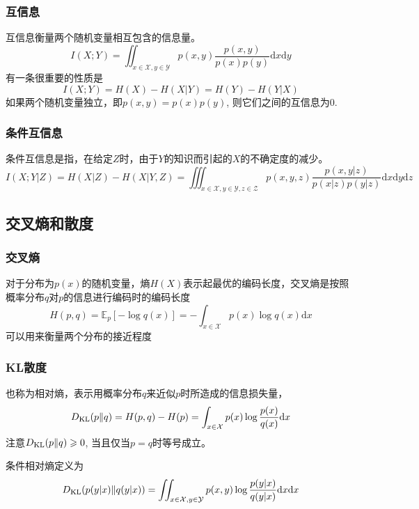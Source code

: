 \subsubsection{互信息}
互信息衡量两个随机变量相互包含的信息量。
\begin{equation}
    I(X;Y)=\iint_{x\in\mathcal{X},y\in\mathcal{Y}}p(x,y)\frac{p(x,y)}{p(x)p(y)}\mathrm{d}x\mathrm{d}y
\end{equation}
有一条很重要的性质是
\begin{equation}
    I(X;Y)=H(X)-H(X|Y)=H(Y)-H(Y|X)
\end{equation}
如果两个随机变量独立，即$p(x,y)=p(x)p(y)$, 则它们之间的互信息为0.

\subsubsection{条件互信息}
条件互信息是指，在给定$Z$时，由于$Y$的知识而引起的$X$的不确定度的减少。
\begin{equation}
    I(X;Y|Z)=H(X|Z)-H(X|Y,Z)=\iiint_{x\in\mathcal{X},y\in\mathcal{Y},z\in\mathcal{Z}}p(x,y,z)\frac{p(x,y|z)}{p(x|z)p(y|z)}\mathrm{d}x\mathrm{d}y\mathrm{d}z
\end{equation}


\subsection{交叉熵和散度}
\subsubsection{交叉熵}
对于分布为$p(x)$的随机变量，熵$H(X)$表示起最优的编码长度，交叉熵是按照概率分布$q$对$p$的信息进行编码时的编码长度
\begin{equation}
    H(p,q)=\mathbb{E}_{p}[-\log q(x)]= -\int_{x\in\mathcal{X}}p(x)\log q(x)\mathrm{d}x
\end{equation}
可以用来衡量两个分布的接近程度

\subsubsection{KL散度}
也称为相对熵，表示用概率分布$q$来近似$p$时所造成的信息损失量，
\begin{equation}
    D_{\mathrm{KL}}(p\|q)=H(p,q)-H(p)=\int_{x\in\mathcal{X}}p(x)\log \frac{p(x)}{q(x)}\mathrm{d}x
\end{equation}
注意$D_{\mathrm{KL}}(p\|q)\geqslant 0$, 当且仅当$p=q$时等号成立。


条件相对熵定义为
\begin{equation}
    D_{\mathrm{KL}}(p(y|x)\|q(y|x))=\iint_{x\in\mathcal{X},y\in\mathcal{Y}}p(x,y)\log \frac{p(y|x)}{q(y|x)}\mathrm{d}x\mathrm{d}x
\end{equation}


